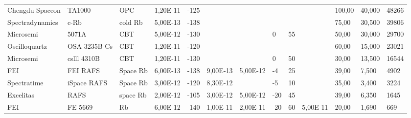 \begin{table}[H]
\begin{tabular}{ll|lllllllllll}
        Chengdu Spaceon & TA1000           & OPC           & 1,20E-11      & -125                   & ~              & ~                & ~                      & ~                      & ~               & 100,00         & 40,000          & 48266                   \\
        Spectradynamics & c-Rb             & cold Rb       & 5,00E-13      & -138                   & ~              & ~                & ~                      & ~                      & ~               & 75,00          & 30,500          & 39806                   \\
        Microsemi       & 5071A            & CBT           & 5,00E-12      & -130                   & ~              & ~                & 0                      & 55                     & ~               & 50,00          & 30,000          & 29700                   \\
        Oscilloquartz   & OSA 3235B Cs     & CBT           & 1,20E-11      & -120                   & ~              & ~                & ~                      & ~                      & ~               & 60,00          & 15,000          & 23021                   \\
        Microsemi       & cslll 4310B      & CBT           & 1,20E-11      & -130                   & ~              & ~                & 0                      & 50                     & ~               & 30,00          & 13,500          & 16544                   \\
        FEI             & FEI RAFS         & Space Rb      & 6,00E-13      & -138                   & 9,00E-13       & 5,00E-12         & -4                     & 25                     & ~               & 39,00          & 7,500           & 4902                    \\
        Spectratime     & iSpace RAFS      & Space Rb      & 3,00E-12      & -120                   & 8,30E-12       & ~                & -5                     & 10                     & ~               & 35,00          & 3,400           & 3224                    \\
        Excelitas       & RAFS             & space Rb      & 2,00E-12      & -105                   & 3,00E-12       & 5,00E-12         & -20                    & 45                     & ~               & 39,00          & 6,350           & 1645                    \\
        FEI             & FE-5669          & Rb            & 6,00E-12      & -140                   & 1,00E-11       & 2,00E-11         & -20                    & 60                     & 5,00E-11        & 20,00          & 1,690           & 669                     \\

\end{tabular}
\end{table}
